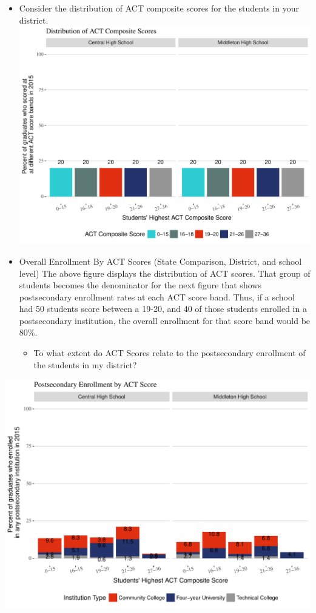 \documentclass[11pt,]{article}
\providecommand{\tightlist}{%
  \setlength{\itemsep}{0pt}\setlength{\parskip}{0pt}}
\begin{document}
\begin{itemize}
\item
  Consider the distribution of ACT composite scores for the students in
  your district.
  \includegraphics{20170411_PSWRR_no_CTE_files/figure-latex/Figure7aa-1.pdf}
\item
  Overall Enrollment By ACT Scores (State Comparison, District, and
  school level) The above figure displays the distribution of ACT
  scores. That group of students becomes the denominator for the next
  figure that shows postsecondary enrollment rates at each ACT score
  band. Thus, if a school had 50 students score between a 19-20, and 40
  of those students enrolled in a postsecondary institution, the overall
  enrollment for that score band would be 80\%.

  \begin{itemize}
  \tightlist
  \item
    To what extent do ACT Scores relate to the postsecondary enrollment
    of the students in my district?
  \end{itemize}
\end{itemize}

\includegraphics{20170411_PSWRR_no_CTE_files/figure-latex/Figure7a-1.pdf}
\end{document}

